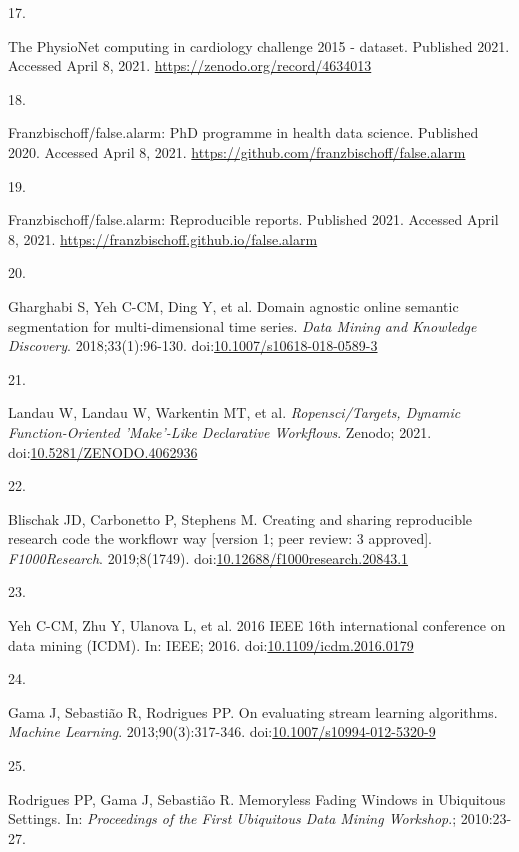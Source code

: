 \documentclass[12pt,twoside]{fmupthesis}
\newlength{\csllabelwidth}
\newlength{\cslhangindent}
\newenvironment{CSLReferences}[2] %
 {%
  \setlength{\parindent}{0pt}
  \ifodd #1 \everypar{\setlength{\hangindent}{\cslhangindent}}\ignorespaces\fi
  \ifnum #2 > 0
  \setlength{\parskip}{#2\baselineskip}
  \fi
 }%
 {}
\newcommand{\CSLLeftMargin}[1]{\parbox[t]{\csllabelwidth}{#1}}
\newcommand{\CSLRightInline}[1]{\parbox[t]{\linewidth - \csllabelwidth}{#1}}
\begin{document}
\begin{CSLReferences}{0}{0}
\leavevmode{}%
\CSLLeftMargin{17. }
\CSLRightInline{The PhysioNet computing in cardiology challenge 2015 - dataset. Published 2021. Accessed April 8, 2021. \url{https://zenodo.org/record/4634013}}

\leavevmode{}%
\CSLLeftMargin{18. }
\CSLRightInline{Franzbischoff/false.alarm: PhD programme in health data science. Published 2020. Accessed April 8, 2021. \url{https://github.com/franzbischoff/false.alarm}}

\leavevmode{}%
\CSLLeftMargin{19. }
\CSLRightInline{Franzbischoff/false.alarm: Reproducible reports. Published 2021. Accessed April 8, 2021. \url{https://franzbischoff.github.io/false.alarm}}

\leavevmode{}%
\CSLLeftMargin{20. }
\CSLRightInline{Gharghabi S, Yeh C-CM, Ding Y, et al. Domain agnostic online semantic segmentation for multi-dimensional time series. \emph{Data Mining and Knowledge Discovery}. 2018;33(1):96-130. doi:\href{https://doi.org/10.1007/s10618-018-0589-3}{10.1007/s10618-018-0589-3}}

\leavevmode{}%
\CSLLeftMargin{21. }
\CSLRightInline{Landau W, Landau W, Warkentin MT, et al. \emph{Ropensci/Targets, Dynamic Function-Oriented 'Make'-Like Declarative Workflows}. Zenodo; 2021. doi:\href{https://doi.org/10.5281/ZENODO.4062936}{10.5281/ZENODO.4062936}}

\leavevmode{}%
\CSLLeftMargin{22. }
\CSLRightInline{Blischak JD, Carbonetto P, Stephens M. Creating and sharing reproducible research code the workflowr way {[}version 1; peer review: 3 approved{]}. \emph{F1000Research}. 2019;8(1749). doi:\href{https://doi.org/10.12688/f1000research.20843.1}{10.12688/f1000research.20843.1}}

\leavevmode{}%
\CSLLeftMargin{23. }
\CSLRightInline{Yeh C-CM, Zhu Y, Ulanova L, et al. 2016 IEEE 16th international conference on data mining (ICDM). In: IEEE; 2016. doi:\href{https://doi.org/10.1109/icdm.2016.0179}{10.1109/icdm.2016.0179}}

\leavevmode{}%
\CSLLeftMargin{24. }
\CSLRightInline{Gama J, Sebastião R, Rodrigues PP. {On evaluating stream learning algorithms}. \emph{Machine Learning}. 2013;90(3):317-346. doi:\href{https://doi.org/10.1007/s10994-012-5320-9}{10.1007/s10994-012-5320-9}}

\leavevmode{}%
\CSLLeftMargin{25. }
\CSLRightInline{Rodrigues PP, Gama J, Sebastião R. {Memoryless Fading Windows in Ubiquitous Settings}. In: \emph{Proceedings of the First Ubiquitous Data Mining Workshop}.; 2010:23-27.}

\end{CSLReferences}

\end{document}
